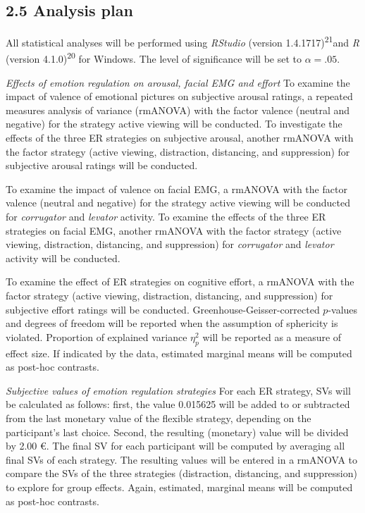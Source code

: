 \documentclass[
  english,
  man,floatsintext]{apa6}
\begin{document}
\hypertarget{analysis-plan}{%
\subsection{2.5 Analysis plan}\label{analysis-plan}}

All statistical analyses will be performed using \emph{RStudio} (version 1.4.1717)\textsuperscript{21}and \emph{R} (version 4.1.0)\textsuperscript{20} for Windows.
The level of significance will be set to \(\alpha=.05\).

\emph{Effects of emotion regulation on arousal, facial EMG and effort} To examine the impact of valence of emotional pictures on subjective arousal ratings, a repeated measures analysis of variance (rmANOVA) with the factor valence (neutral and negative) for the strategy active viewing will be conducted.
To investigate the effects of the three ER strategies on subjective arousal, another rmANOVA with the factor strategy (active viewing, distraction, distancing, and suppression) for subjective arousal ratings will be conducted.

To examine the impact of valence on facial EMG, a rmANOVA with the factor valence (neutral and negative) for the strategy active viewing will be conducted for \emph{corrugator} and \emph{levator} activity.
To examine the effects of the three ER strategies on facial EMG, another rmANOVA with the factor strategy (active viewing, distraction, distancing, and suppression) for \emph{corrugator} and \emph{levator} activity will be conducted.

To examine the effect of ER strategies on cognitive effort, a rmANOVA with the factor strategy (active viewing, distraction, distancing, and suppression) for subjective effort ratings will be conducted.
Greenhouse-Geisser-corrected \(p\)-values and degrees of freedom will be reported when the assumption of sphericity is violated.
Proportion of explained variance \(\eta_{p}^{2}\) will be reported as a measure of effect size.
If indicated by the data, estimated marginal means will be computed as post-hoc contrasts.

\emph{Subjective values of emotion regulation strategies} For each ER strategy, SVs will be calculated as follows: first, the value 0.015625 will be added to or subtracted from the last monetary value of the flexible strategy, depending on the participant's last choice.
Second, the resulting (monetary) value will be divided by 2.00 €.
The final SV for each participant will be computed by averaging all final SVs of each strategy.
The resulting values will be entered in a rmANOVA to compare the SVs of the three strategies (distraction, distancing, and suppression) to explore for group effects.
Again, estimated, marginal means will be computed as post-hoc contrasts.
\end{document}
